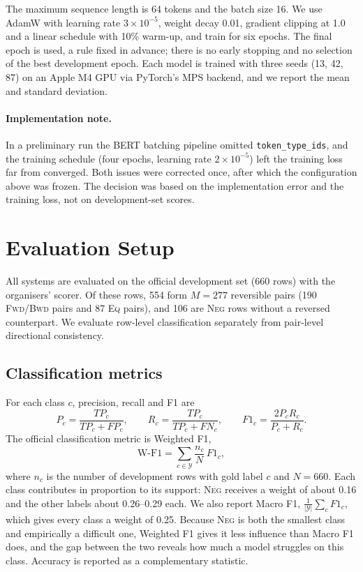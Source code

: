 \documentclass[11pt,a4paper]{article}
\newcommand{\EQ}{\textsc{Eq}}
\newcommand{\FWD}{\textsc{Fwd}}
\newcommand{\BWD}{\textsc{Bwd}}
\newcommand{\NEG}{\textsc{Neg}}
\begin{document}
The maximum sequence length is 64 tokens and the batch size 16. We use AdamW with learning rate $3\times10^{-5}$, weight decay 0.01, gradient clipping at 1.0 and a linear schedule with 10\% warm-up, and train for six epochs. The final epoch is used, a rule fixed in advance; there is no early stopping and no selection of the best development epoch. Each model is trained with three seeds (13, 42, 87) on an Apple M4 GPU via PyTorch's MPS backend, and we report the mean and standard deviation.

\paragraph{Implementation note.} In a preliminary run the BERT batching pipeline omitted \texttt{token\_type\_ids}, and the training schedule (four epochs, learning rate $2\times10^{-5}$) left the training loss far from converged. Both issues were corrected once, after which the configuration above was frozen. The decision was based on the implementation error and the training loss, not on development-set scores.

\section{Evaluation Setup}
\label{sec:evaluation}

All systems are evaluated on the official development set (660 rows) with the organisers' scorer. Of these rows, 554 form $M=277$ reversible pairs (190 \FWD/\BWD{} pairs and 87 \EQ{} pairs), and 106 are \NEG{} rows without a reversed counterpart. We evaluate row-level classification separately from pair-level directional consistency.

\subsection{Classification metrics}
For each class $c$, precision, recall and F1 are
\begin{equation}
P_c=\frac{TP_c}{TP_c+FP_c},\qquad R_c=\frac{TP_c}{TP_c+FN_c},\qquad F1_c=\frac{2P_cR_c}{P_c+R_c}.
\end{equation}
The official classification metric is Weighted F1,
\begin{equation}
\mathrm{W\text{-}F1}=\sum_{c\in\mathcal{Y}}\frac{n_c}{N}\,F1_c ,
\end{equation}
where $n_c$ is the number of development rows with gold label $c$ and $N=660$. Each class contributes in proportion to its support: \NEG{} receives a weight of about 0.16 and the other labels about 0.26--0.29 each. We also report Macro F1, $\frac{1}{|\mathcal{Y}|}\sum_c F1_c$, which gives every class a weight of 0.25. Because \NEG{} is both the smallest class and empirically a difficult one, Weighted F1 gives it less influence than Macro F1 does, and the gap between the two reveals how much a model struggles on this class. Accuracy is reported as a complementary statistic.
\end{document}
